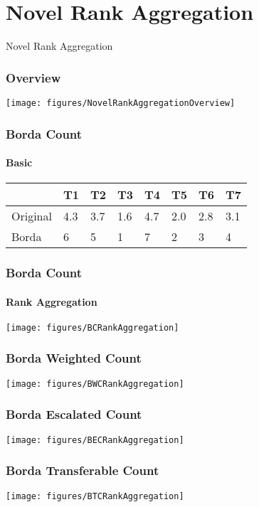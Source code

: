 \section{Novel Rank Aggregation}

\begin{frame}
	\begin{center}
		\huge Novel Rank Aggregation
	\end{center}
\end{frame}

\begin{frame}
	\frametitle{Overview}
	\centering
	\texttt{[image: figures/NovelRankAggregationOverview]}
\end{frame}

\begin{frame}
	\frametitle{Borda Count}
	\framesubtitle{Basic}
	\centering
	\begin{tabular}{|l|l|l|l|l|l|l|l|}
		\hline
		& T1  & T2  & T3  & T4  & T5  & T6  & T7  \\ \hline
		Original & 4.3 & 3.7 & 1.6 & 4.7 & 2.0 & 2.8 & 3.1 \\ \hline
		Borda    & 6   & 5   & 1   & 7   & 2   & 3   & 4   \\ \hline
	\end{tabular}
\end{frame}

\begin{frame}
	\frametitle{Borda Count}
	\framesubtitle{Rank Aggregation}
	\centering
	\texttt{[image: figures/BCRankAggregation]}
\end{frame}

\begin{frame}
	\frametitle{Borda Weighted Count}
	\centering
	\texttt{[image: figures/BWCRankAggregation]}
\end{frame}

\begin{frame}
	\frametitle{Borda Escalated Count}
	\centering
	\texttt{[image: figures/BECRankAggregation]}
\end{frame}

\begin{frame}
	\frametitle{Borda Transferable Count}
	\centering
	\texttt{[image: figures/BTCRankAggregation]}
\end{frame}